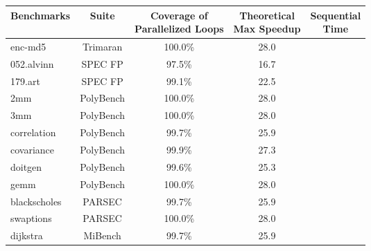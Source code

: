 \small
\centering
\begin{tabular}{|l|c|c|c|c|}
\hline
Benchmarks & Suite & \makecell{Coverage of \\Parallelized Loops} & \makecell{Theoretical \\Max Speedup} & \makecell{Sequential \\Time} \\ %
\hline
enc-md5    & Trimaran & 100.0\% & 28.0  \\ %
\hline
052.alvinn & SPEC FP  & 97.5\%  & 16.7 & \\ %
\hline
179.art    & SPEC FP  & 99.1\%  & 22.5 \\ %
\hline
2mm        & PolyBench & 100.0\% & 28.0 \\ %
\hline
3mm        & PolyBench & 100.0\% & 28.0 \\ %
\hline
correlation & PolyBench & 99.7\% & 25.9 \\ %
\hline
covariance & PolyBench & 99.9\%  & 27.3 \\ %
\hline
doitgen   & PolyBench & 99.6\%  & 25.3  \\ %
\hline
gemm     & PolyBench  & 100.0\% & 28.0 \\ %
\hline
blackscholes & PARSEC & 99.7\% & 25.9 \\ %
\hline
swaptions & PARSEC & 100.0\% & 28.0 \\ %
\hline
dijkstra & MiBench  & 99.7\%  & 25.9 \\ %
\hline
\end{tabular}